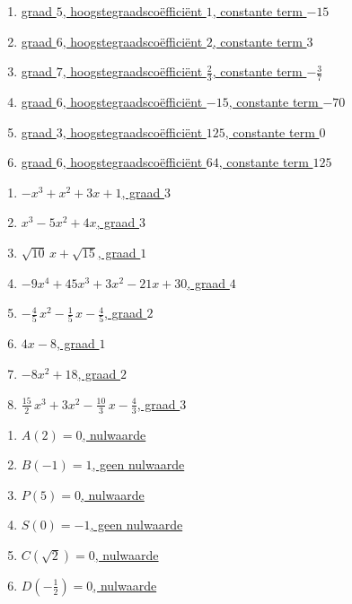 \documentclass{ximera}
\begin{document}
\clearpage

\begin{Antwoord} \label{antw1.5}
\begin{enumerate}
\item
\hyperlink{oef1.5}{graad $5$, hoogstegraadsco\"effici\"ent $1$, constante term $-15$}
\item
\hyperlink{oef1.5}{graad $6$, hoogstegraadsco\"effici\"ent $2$, constante term $3$}
\item
\hyperlink{oef1.5}{graad $7$, hoogstegraadsco\"effici\"ent $\frac{2}{3}$, constante term $-\frac{3}{7}$}
\item
\hyperlink{oef1.5}{graad $6$, hoogstegraadsco\"effici\"ent $-15$, constante term $-70$}
\item
\hyperlink{oef1.5}{graad $3$, hoogstegraadsco\"effici\"ent $125$, constante term $0$}
\item
\hyperlink{oef1.5}{graad $6$, hoogstegraadsco\"effici\"ent $64$, constante term $125$}
\end{enumerate}
\setcounter{enumi}{6}
\end{Antwoord}

\begin{Antwoord} \label{antw1.7}
\begin{enumerate}
\item
\hyperlink{oef1.7}{$-x^3+x^2+3x+1$, graad $3$}
\item
\hyperlink{oef1.7}{$x^3-5x^2+4x$, graad $3$}
\item
\hyperlink{oef1.7}{$\sqrt{10}\,x+\sqrt{15}$, graad $1$}
\item
\hyperlink{oef1.7}{$-9x^4+45x^3+3x^2-21x+30$, graad $4$}
\item
\hyperlink{oef1.7}{$-\frac{4}{5}\,x^2-\frac{1}{5}\,x-\frac{4}{5}$, graad $2$}
\item
\hyperlink{oef1.7}{$4x-8$, graad $1$}
\item
\hyperlink{oef1.7}{$-8x^2+18$, graad $2$}
\item
\hyperlink{oef1.7}{$\frac{15}{2}\,x^3 + 3x^2 - \frac{10}{3}\,x-\frac{4}{3}$, graad $3$}
\end{enumerate}
\end{Antwoord}

\begin{Antwoord} \label{antw1.8}
\begin{enumerate}
\item
\hyperlink{oef1.8}{$A(2)=0$, nulwaarde}
\item
\hyperlink{oef1.8}{$B(-1)=1$, geen nulwaarde}
\item
\hyperlink{oef1.8}{$P(5)=0$, nulwaarde}
\item
\hyperlink{oef1.8}{$S(0)=-1$, geen nulwaarde}
\item
\hyperlink{oef1.8}{$C(\sqrt{2})=0$, nulwaarde}
\item
\hyperlink{oef1.8}{$D\left(-\frac{1}{2}\right)=0$, nulwaarde}
\end{enumerate}
\end{Antwoord}
\end{document}
